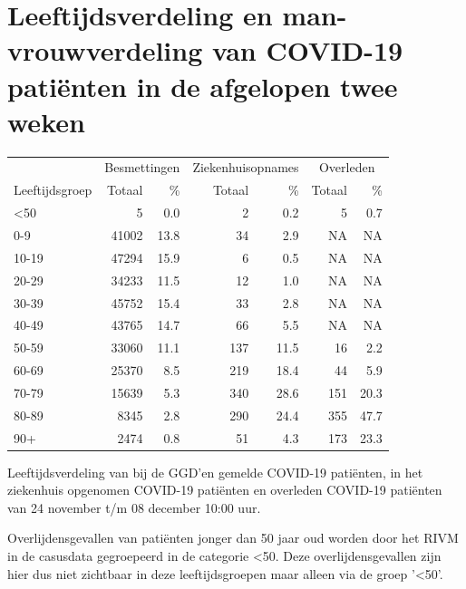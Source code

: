 \documentclass[
  english,
  man,floatsintext]{apa6}
\begin{document}
\hypertarget{leeftijdsverdeling-en-man-vrouwverdeling-van-covid-19-patiuxebnten-in-de-afgelopen-twee-weken}{%
\section{Leeftijdsverdeling en man-vrouwverdeling van COVID-19 patiënten in de afgelopen twee weken}\label{leeftijdsverdeling-en-man-vrouwverdeling-van-covid-19-patiuxebnten-in-de-afgelopen-twee-weken}}

\begin{table}
\centering\begingroup\fontsize{11}{13}\selectfont

\begin{threeparttable}
\begin{tabular}{lrrrrrr}
\toprule
\multicolumn{1}{c}{ } & \multicolumn{2}{c}{Besmettingen} & \multicolumn{2}{c}{Ziekenhuisopnames} & \multicolumn{2}{c}{Overleden} \\
\cmidrule(l{3pt}r{3pt}){2-3} \cmidrule(l{3pt}r{3pt}){4-5} \cmidrule(l{3pt}r{3pt}){6-7}
Leeftijdsgroep & Totaal & \% & Totaal & \% & Totaal & \%\\
\midrule
<50 & 5 & 0.0 & 2 & 0.2 & 5 & 0.7\\
0-9 & 41002 & 13.8 & 34 & 2.9 & NA & NA\\
10-19 & 47294 & 15.9 & 6 & 0.5 & NA & NA\\
20-29 & 34233 & 11.5 & 12 & 1.0 & NA & NA\\
30-39 & 45752 & 15.4 & 33 & 2.8 & NA & NA\\
40-49 & 43765 & 14.7 & 66 & 5.5 & NA & NA\\
50-59 & 33060 & 11.1 & 137 & 11.5 & 16 & 2.2\\
60-69 & 25370 & 8.5 & 219 & 18.4 & 44 & 5.9\\
70-79 & 15639 & 5.3 & 340 & 28.6 & 151 & 20.3\\
80-89 & 8345 & 2.8 & 290 & 24.4 & 355 & 47.7\\
90+ & 2474 & 0.8 & 51 & 4.3 & 173 & 23.3\\
\bottomrule
\end{tabular}
\begin{tablenotes}
\item[1] Leeftijdsverdeling van bij de GGD’en gemelde COVID-19 patiënten, in het ziekenhuis opgenomen COVID-19 patiënten en overleden COVID-19 patiënten van 24 november t/m 08 december 10:00 uur.
\item[2] Overlijdensgevallen van patiënten jonger dan 50 jaar oud worden door het RIVM in de casusdata gegroepeerd in de categorie <50. Deze overlijdensgevallen zijn hier dus niet zichtbaar in deze leeftijdsgroepen maar alleen via de groep '<50'.
\end{tablenotes}
\end{threeparttable}
\endgroup{}
\end{table}
\end{document}
